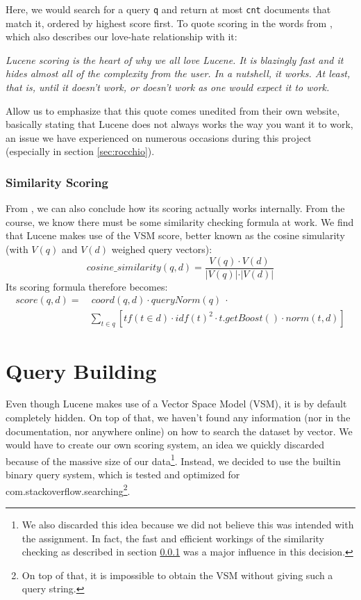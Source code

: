 \documentclass[11pt]{article}
\begin{document}
Here, we would search for a query \texttt{q} and return at most \texttt{cnt} documents that match it, ordered by highest score first. To quote scoring in the words from \cite{lucene}, which also describes our love-hate relationship with it:
\begin{displayquote}
    \textsl{Lucene scoring is the heart of why we all love Lucene. It is blazingly fast and it hides almost all of the complexity from the user. In a nutshell, it works. At least, that is, until it doesn't work, or doesn't work as one would expect it to work.}
\end{displayquote}

Allow us to emphasize that this quote comes unedited from their own website, basically stating that Lucene does not always works the way you want it to work, an issue we have experienced on numerous occasions during this project (especially in section \ref{sec:rocchio}).

\subsubsection{Similarity Scoring}\label{sec:ss}
From \cite{lucene}, we can also conclude how its scoring actually works internally. From the course, we know there must be some similarity checking formula at work. We find that Lucene makes use of the \textsf{VSM score}, better known as the \textsf{cosine simularity} (with $V(q)$ and $V(d)$ weighed query vectors):
$$cosine\_similarity(q, d) = \frac{V(q)\cdot V(d)}{\vert V(q)\vert\cdot\vert V(d)\vert}$$
Its scoring formula therefore becomes:
\begin{align*}
    score(q, d) =&\ coord(q, d)\cdot queryNorm(q)\ \cdot\\
    &\sum_{t \in q}\left[tf(t\in d)\cdot idf(t)^2 \cdot t.getBoost()\cdot norm(t, d)\right]
\end{align*}

\section{Query Building}\label{sec:query}
Even though Lucene makes use of a Vector Space Model (VSM), it is by default completely hidden. On top of that, we haven't found any information (nor in the documentation, nor anywhere online) on how to search the dataset by vector. We would have to create our own scoring system, an idea we quickly discarded because of the massive size of our data\footnote{We also discarded this idea because we did not believe this was intended with the assignment. In fact, the fast and efficient workings of the similarity checking as described in section \ref{sec:ss} was a major influence in this decision.}. Instead, we decided to use the builtin binary query system, which is tested and optimized for com.stackoverflow.searching\footnote{On top of that, it is impossible to obtain the VSM without giving such a query string.}.
\end{document}
